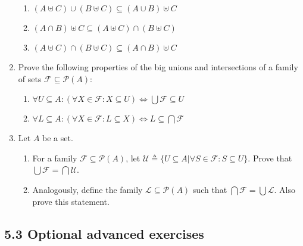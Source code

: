 \documentclass[10pt,\jkfside,a4paper]{article}
\begin{document}
\begin{enumerate}
\begin{enumerate}
\item $(A \uplus C) \cup (B \uplus C) \subseteq (A \cup B) \uplus C$



\item $(A \cap B) \uplus C \subseteq (A \uplus C) \cap (B \uplus C)$



\item $(A \uplus C) \cap (B \uplus C) \subseteq (A \cap B) \uplus C$



\end{enumerate}

\item Prove the following properties of the big unions and intersections of a family of sets $\mathcal{F}\subseteq \mathcal{P}(A)$:

\begin{enumerate}

\item $\forall U \subseteq A: (\forall X \in \mathcal{F}: X \subseteq U) \Longleftrightarrow \bigcup \mathcal{F}\subseteq U$



\item $\forall L \subseteq A: (\forall X \in \mathcal{F}: L \subseteq X) \Longleftrightarrow L \subseteq \bigcap \mathcal{F}$



\end{enumerate}

\item Let $A$ be a set.

\begin{enumerate}

\item For a family $\mathcal{F} \subseteq \mathcal{P}(A)$, let $\mathcal{U} \triangleq \{ U \subseteq A| \forall S \in \mathcal{F}: S \subseteq U\}$. 
Prove that $\bigcup\mathcal{F} = \bigcap\mathcal{U}$.



\item Analogously, define the family $\mathcal{L}\subseteq \mathcal{P}(A)$ such that $\bigcap \mathcal{F} = \bigcup \mathcal{L}$. Also prove this statement.



\end{enumerate}

\end{enumerate}

\subsection*{5.3 Optional advanced exercises}
\end{document}
